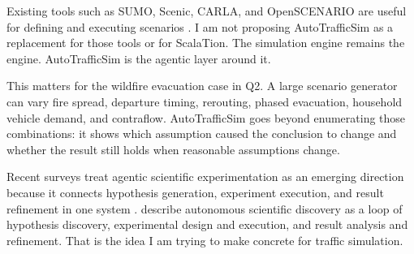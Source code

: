 \begin{bibunit}[plainnat]
Existing tools such as SUMO, Scenic, CARLA, and OpenSCENARIO are useful
for defining and executing scenarios
\citep{lopez2018sumo,fremont2019scenic,dosovitskiy2017carla,asam2024openscenario}.
I am not proposing AutoTrafficSim as a replacement for those tools or
for ScalaTion. The simulation engine remains the engine. AutoTrafficSim
is the agentic layer around it.

This matters for the wildfire evacuation case in Q2. A large scenario
generator can vary fire spread, departure timing, rerouting, phased
evacuation, household vehicle demand, and contraflow. AutoTrafficSim
goes beyond enumerating those combinations: it shows which assumption
caused the conclusion to change and whether the result still holds when
reasonable assumptions change.

Recent surveys treat agentic scientific experimentation as an emerging
direction because it connects hypothesis generation, experiment
execution, and result refinement in one system
\citep{ren2503towards,zhao2025llm,zhou2025autonomous}.
\citet{zhou2025autonomous} describe autonomous scientific discovery as a
loop of hypothesis discovery, experimental design and execution, and
result analysis and refinement. That is the idea I am trying to make
concrete for traffic simulation.


\bigskip
{}
{}
\putbib[refQ1]
\end{bibunit}
